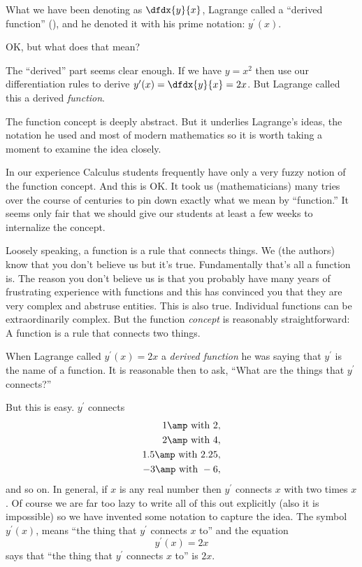 \begin{Digression}
  What we have been denoting as $\dfdx{y}{x}$, Lagrange called a
  ``derived function'' (), and he
  denoted it with his prime notation: $y^\prime(x)$.

  OK, but what does that mean?

The ``derived'' part seems clear enough. If
  we have $y=x^2$ then use our differentiation rules to derive
  $y^\prime(x)=\dfdx{y}{x}=2x$. But Lagrange called this a derived
  \emph{function}.

  The function concept is deeply abstract. But it underlies
  Lagrange's ideas, the notation he used and most of modern
  mathematics so it is worth taking a moment to examine the idea
  closely.

  In our experience Calculus students frequently have only a very
  fuzzy notion of the function concept. And this is OK.  It took us
  (mathematicians) many tries over the course of centuries to pin down
  exactly what we mean by ``function.'' It seems only fair that we
  should give our students at least a few weeks to internalize the
  concept.

  Loosely speaking, a function is a rule that connects things. We (the
  authors) know that you don't believe us but it's true. Fundamentally
  that's all a function is. The reason you don't believe us is that
  you probably have many years of frustrating experience with
  functions and this has convinced you that they are very complex and
  abstruse entities. This is also true. Individual functions can be
  extraordinarily complex. But the function \emph{concept} is
  reasonably straightforward: A function is a rule that connects two
  things.

  When Lagrange called $y^\prime(x)=2x$ a \emph{derived function} he
  was saying that $y^\prime$ is the name of a function.  It is
  reasonable then to ask, ``What are the things that $y^\prime$
  connects?''

  But this is easy. $y^\prime$ connects
  \begin{align*}
    1 \amp\text{ with }2, \\
    2 \amp\text{ with } 4,\\
    1.5 \amp\text{ with }2.25,\\
    -3  \amp\text{ with } -6,
  \end{align*}
  and so on. In general, if $x$ is any real number then $y^\prime$
  connects $x$ with two times $x$. Of course we are far too lazy to
  write all of this out explicitly (also it is impossible) so
  we have invented some notation to capture the idea. The symbol
  $y^\prime(x)$, means ``the thing that $y^\prime$ connects $x$ to''
  and the equation
  $$
  y^\prime(x) = 2x
  $$
  says that ``the thing that $y^\prime$ connects $x$ to''
  is $2x$.


\end{Digression}
